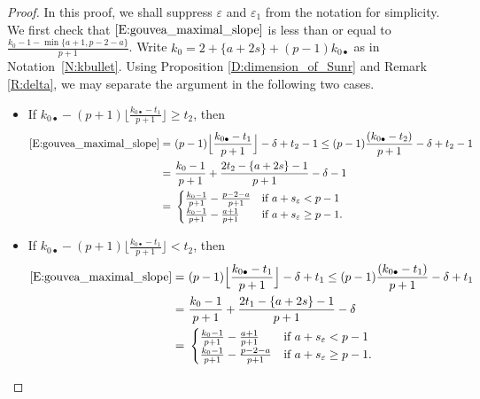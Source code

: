 \begin{proof}
    In this proof, we shall suppress $\varepsilon$ and $\varepsilon_1$ from the notation for simplicity.
    We first check that $\eqref{E:gouvea_maximal_slope}$ is less than or equal to $\frac{k_0-1-\min\{a+1,p-2-a\}}{p+1}$.
    Write $k_0 = 2+\{a+2s\} + (p-1)k_{0\bullet}$ as in Notation~\ref{N:kbullet}. Using Proposition \ref{D:dimension_of_Sunr} and Remark \ref{R:delta}, we may separate the argument in the following two cases.
    \begin{itemize}
    \item If $k_{0\bullet} - (p+1) \lfloor \frac{k_{0\bullet}-t_1}{p+1}\rfloor  \geq t_2$, then
    \begin{align*}
    \eqref{E:gouvea_maximal_slope}
    \nonumber
    =\ & (p-1)\Big\lfloor \frac{k_{0\bullet}-t_1}{p+1}\Big\rfloor -\delta + t_2-1   \leq (p-1)\frac{(k_{0\bullet}-t_2)}{p+1} -\delta +t_2 -1 \\
     =\ & \frac{k_0-1}{p+1} + \frac{2t_2-\{ a+2 s\} -1}{p+1}-\delta-1 \\
    \nonumber
    =\ & \begin{cases}
    	\frac{k_0-1}{p+1}- \frac{p-2-a}{p+1} & \textrm{if } a+s_\varepsilon < p-1
    	\\
    	\frac{k_0-1}{p+1}- \frac{a+1}{p+1} & \textrm{if } a+s_\varepsilon \geq p-1.
    \end{cases}
    \end{align*}
    \item If $k_{0\bullet} - (p+1) \lfloor \frac{k_{0\bullet}-t_1}{p+1}\rfloor  < t_2$, then
    \begin{align*}
    \eqref{E:gouvea_maximal_slope}
    \nonumber
    =\ & (p-1)\Big\lfloor \frac{k_{0\bullet}-t_1}{p+1}\Big\rfloor -\delta + t_1   \leq (p-1)\frac{(k_{0\bullet}-t_1)}{p+1} - \delta + t_1 \\
    =\ &\frac{k_0-1}{p+1} + \frac{2t_1-\{ a+2 s\} -1}{p+1}-\delta \\
    \nonumber
    =\ & \begin{cases}
    	\frac{k_0-1}{p+1}- \frac{a+1}{p+1}  & \textrm{if } a+s_\varepsilon < p-1
    	\\
    	\frac{k_0-1}{p+1}- \frac{p-2-a}{p+1}& \textrm{if } a+s_\varepsilon \geq p-1.

\end{cases}
\end{align*}
\end{itemize}
\end{proof}
